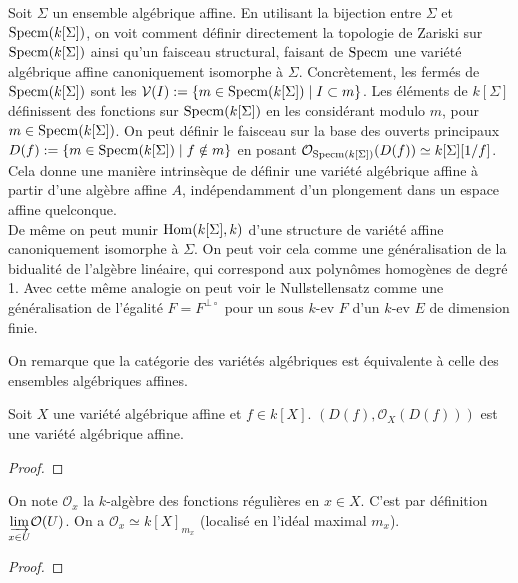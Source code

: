 \begin{rem}
Soit $\Sigma$ un ensemble algébrique affine. En utilisant la bijection entre $\Sigma$ et $\operatorname{Specm} (k[\Sigma])$, on voit comment définir directement la topologie de Zariski sur $\operatorname{Specm} (k[\Sigma])$ ainsi qu'un faisceau structural, faisant de $\operatorname{Specm}$ une variété algébrique affine canoniquement isomorphe à $\Sigma$. Concrètement, les fermés de $\operatorname{Specm} (k[\Sigma])$ sont les $\mathcal{V}(I):=\lbrace m \in \operatorname{Specm} (k[\Sigma]) \mid I\subset m \rbrace$. Les éléments de $k[\Sigma]$ définissent des fonctions sur $\operatorname{Specm} (k[\Sigma])$ en les considérant modulo $m$, pour $m \in \operatorname{Specm} (k[\Sigma])$. On peut définir le faisceau sur la base des ouverts principaux $D(f):=\lbrace m \in \operatorname{Specm} (k[\Sigma]) \mid f \notin m\rbrace$ en posant $\mathcal{O}_{\operatorname{Specm} (k[\Sigma])}(D(f))\simeq k[\Sigma][1/f]$.\\
Cela donne une manière intrinsèque de définir une variété algébrique affine à partir d'une algèbre affine $A$, indépendamment d'un plongement dans un espace affine quelconque.\\
De même on peut munir $\operatorname{Hom}(k[\Sigma],k)$ d'une structure de variété affine canoniquement isomorphe à $\Sigma$. On peut voir cela comme une généralisation de la bidualité de l'algèbre linéaire, qui correspond aux polynômes homogènes de degré 1. Avec cette même analogie on peut voir le Nullstellensatz comme une généralisation de l'égalité $F=F^{\bot\circ}$ pour un sous $k$-ev $F$ d'un $k$-ev $E$ de dimension finie.
\end{rem}

On remarque que la catégorie des variétés algébriques est équivalente à celle des ensembles algébriques affines.
\begin{ex}
Soit $X$ une variété algébrique affine et $f\in k[X]$. $(D(f), \mathcal{O}_X(D(f)))$ est une variété algébrique affine.
\end{ex}
\begin{proof}

\end{proof}

\begin{prop}
On note $\mathcal{O}_x$ la $k$-algèbre des fonctions régulières en $x\in X$. C'est par définition $ \underset{x\in U}{\varinjlim} \mathcal{O}(U)$. On a $\mathcal{O}_x\simeq k[X]_{m_x}$ (localisé en l'idéal maximal $m_x$).
\end{prop}
\begin{proof}

\end{proof}

